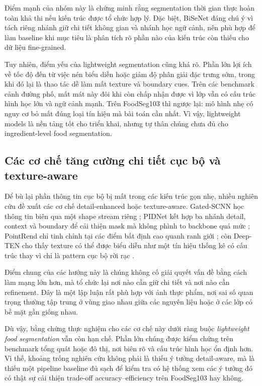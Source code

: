 Điểm mạnh của nhóm này là chứng minh rằng segmentation thời gian thực hoàn toàn khả thi nếu kiến trúc được tổ chức hợp lý. Đặc biệt, BiSeNet đáng chú ý vì tách riêng nhánh giữ chi tiết không gian và nhánh học ngữ cảnh, nên phù hợp để làm baseline khi mục tiêu là phân tích rõ phần nào của kiến trúc còn thiếu cho dữ liệu fine-grained.

Tuy nhiên, điểm yếu của lightweight segmentation cũng khá rõ. Phần lớn lợi ích về tốc độ đến từ việc nén biểu diễn hoặc giảm độ phân giải đặc trưng sớm, trong khi đó lại là thao tác dễ làm mất texture và boundary cues. Trên các benchmark cảnh đường phố, mất mát này đôi khi còn chấp nhận được vì lớp vẫn có cấu trúc hình học lớn và ngữ cảnh mạnh. Trên FoodSeg103 thì ngược lại: mô hình nhẹ có nguy cơ bỏ mất đúng loại tín hiệu mà bài toán cần nhất. Vì vậy, lightweight models là nền tảng tốt cho triển khai, nhưng tự thân chúng chưa đủ cho ingredient-level food segmentation.

\subsection{Các cơ chế tăng cường chi tiết cục bộ và texture-aware}

Để bù lại phần thông tin cục bộ bị mất trong các kiến trúc gọn nhẹ, nhiều nghiên cứu đề xuất các cơ chế detail-enhanced hoặc texture-aware. Gated-SCNN học thông tin biên qua một shape stream riêng \cite{takikawa2019gatedscnn}; PIDNet kết hợp ba nhánh detail, context và boundary để cải thiện mask mà không phình to backbone quá mức \cite{xu2023pidnet}; PointRend chỉ tinh chỉnh tại các điểm bất định cao quanh ranh giới \cite{kirillov2020pointrend}; còn Deep-TEN cho thấy texture có thể được biểu diễn như một tín hiệu thống kê có cấu trúc thay vì chỉ là pattern cục bộ rời rạc \cite{zhang2017deepten}.

Điểm chung của các hướng này là chúng không cố giải quyết vấn đề bằng cách làm mạng lớn hơn, mà tổ chức lại nơi nào cần giữ chi tiết và nơi nào cần refinement. Đây là một lập luận rất phù hợp với ảnh thực phẩm, nơi sai số quan trọng thường tập trung ở vùng giao nhau giữa các nguyên liệu hoặc ở các lớp có bề mặt gần giống nhau.

Dù vậy, bằng chứng thực nghiệm cho các cơ chế này dưới ràng buộc \emph{lightweight food segmentation} vẫn còn hạn chế. Phần lớn chúng được kiểm chứng trên benchmark tổng quát hoặc đô thị, nơi biên rõ và cấu trúc hình học ổn định hơn. Vì thế, khoảng trống nghiên cứu không phải là thiếu ý tưởng detail-aware, mà là thiếu một pipeline baseline đủ sạch để kiểm tra có hệ thống xem các ý tưởng đó có thật sự cải thiện trade-off accuracy--efficiency trên FoodSeg103 hay không.

